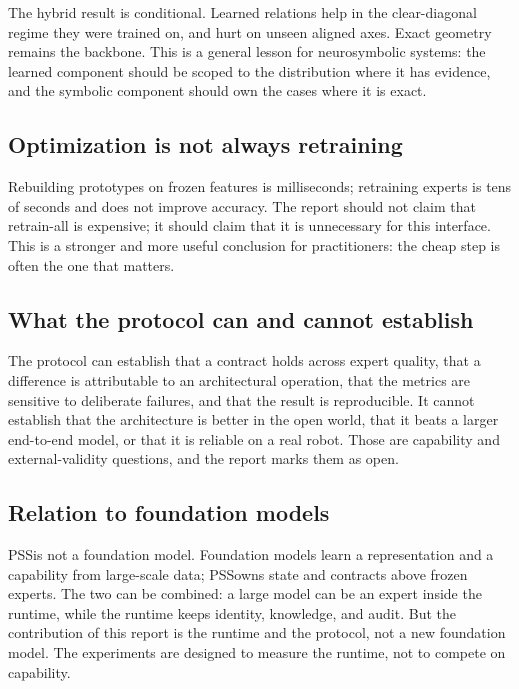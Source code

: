 \documentclass[10pt]{article}
\newcommand{\pss}{PSS}
\begin{document}
The hybrid result is conditional. Learned relations help in the clear-diagonal
regime they were trained on, and hurt on unseen aligned axes. Exact geometry
remains the backbone. This is a general lesson for neurosymbolic systems: the
learned component should be scoped to the distribution where it has evidence,
and the symbolic component should own the cases where it is exact.

\subsection{Optimization is not always retraining}

Rebuilding prototypes on frozen features is milliseconds; retraining experts is
tens of seconds and does not improve accuracy. The report should not claim that
retrain-all is expensive; it should claim that it is unnecessary for this
interface. This is a stronger and more useful conclusion for practitioners: the
cheap step is often the one that matters.

\subsection{What the protocol can and cannot establish}

The protocol can establish that a contract holds across expert quality, that a
difference is attributable to an architectural operation, that the metrics are
sensitive to deliberate failures, and that the result is reproducible. It cannot
establish that the architecture is better in the open world, that it beats a
larger end-to-end model, or that it is reliable on a real robot. Those are
capability and external-validity questions, and the report marks them as open.

\subsection{Relation to foundation models}

\pss is not a foundation model. Foundation models learn a representation and a
capability from large-scale data; \pss owns state and contracts above frozen
experts. The two can be combined: a large model can be an expert inside the
runtime, while the runtime keeps identity, knowledge, and audit. But the
contribution of this report is the runtime and the protocol, not a new
foundation model. The experiments are designed to measure the runtime, not to
compete on capability.

\end{document}
